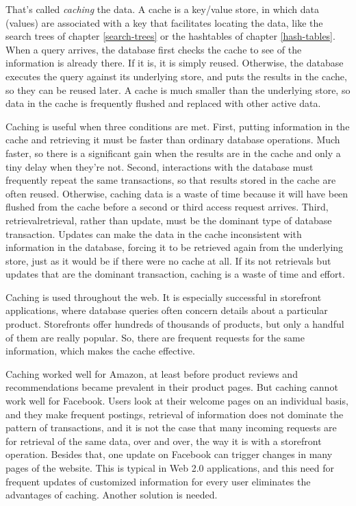 That's called \emph{caching} the data.  
A cache is a key/value store, 
in which data (values) are associated with a key
that facilitates locating the data,
like the search trees of chapter \ref{search-trees} 
or the hashtables of chapter \ref{hash-tables}.
When a query arrives, the database first checks 
the cache to see of the information is already there.
If it is, it is simply reused.  
Otherwise, the database executes the query against its underlying store,
and puts the results in the cache, so they can be reused later.
A cache is much smaller than the underlying store, 
so data in the cache is frequently flushed and replaced with other active data.

Caching is useful when three conditions are met.
First, putting information in the cache and retrieving it
must be faster than ordinary database operations.
Much faster, so there is a significant gain 
when the results are in the cache and only a tiny delay when they're not.  
Second, interactions with the database must frequently repeat the same transactions,
so that results stored in the cache are often reused. 
Otherwise, caching data is a waste of time because it will
have been flushed from the cache before a second or third access request arrives.
Third, retrievalretrieval, 
rather than update, must be the dominant type of database transaction.
Updates can make the data in the cache inconsistent with information in the database,
forcing it to be retrieved again from the underlying store, 
just as it would be if there were no cache at all.
If its not retrievals but updates that are the dominant transaction, 
caching is a waste of time and effort.

Caching is used throughout the web. 
It is especially successful in storefront applications, 
where database queries often concern details about a particular product.
Storefronts offer hundreds of thousands of products,
but only a handful of them are really popular.
So, there are frequent requests for the same information,
which makes the cache effective.

Caching worked well for Amazon, at least before product reviews 
and recommendations became prevalent in their product pages.
But caching cannot work well for Facebook.  
Users look at their welcome pages on an individual basis, 
and they make frequent postings, retrieval of information
does not dominate the pattern of transactions,
and it is not the case that many incoming requests 
are for retrieval of the same data, over and over,
the way it is with a storefront operation.
Besides that, one update on Facebook can trigger changes in many pages of the website.
This is typical in Web 2.0 applications, 
and this need for frequent updates of customized information 
for every user eliminates the advantages of caching. 
Another solution is needed.

